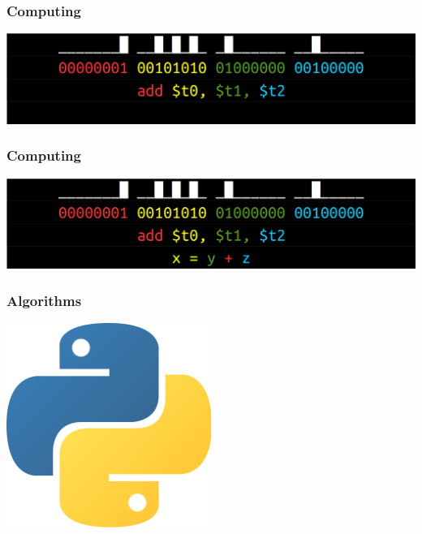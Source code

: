 \documentclass[11pt]{beamer}
\begin{document}
\begin{frame}[fragile]
  \frametitle{Computing}

  \includegraphics[width=\textwidth]{./img/assembler-3.png}
\end{frame}

\begin{frame}[fragile]
  \frametitle{Computing}

  \includegraphics[width=\textwidth]{./img/assembler-4.png}
\end{frame}

\begin{frame}[fragile]
  \frametitle{Algorithms}

  \begin{centering}
  \includegraphics[width=0.5\textwidth]{./img/python-logo.png}
  \end{centering}
\end{frame}
\end{document}
